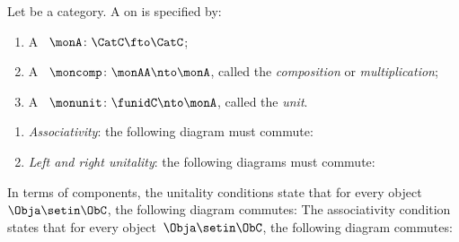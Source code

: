 \begin{ctdefinition}[Monad]
    \label{def:monad}
    Let \CatC be a category.
    A  on \CatC is specified by:\\
    \constit
    \begin{enumerate}
        \item A ~$ \monA \colon \CatC \fto \CatC$;
        \item A ~$\moncomp \colon \monAA \nto \monA$, called the \emph{composition} or \emph{multiplication};
        \item A ~$\monunit \colon \funidC \nto \monA$, called the \emph{unit}.
    \end{enumerate}
    \condit
    \begin{enumerate}
        \item \emph{Associativity}: the following diagram must commute:
        \item \emph{Left and right unitality}: the following diagrams must commute:
    \end{enumerate}
\end{ctdefinition}

\begin{remark}
    \label{rem:monad-condition-components}
    In terms of components, the unitality conditions state that for every object~$\Obja \setin \ObC$, the following diagram commutes:
    The associativity condition states that for every object~$\Obja \setin \ObC$, the following diagram commutes:
\end{remark}



